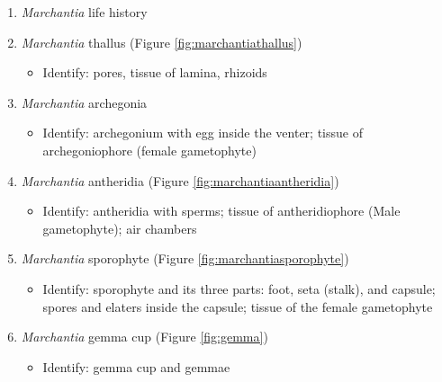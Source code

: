 \documentclass[]{book}
\providecommand{\tightlist}{%
  \setlength{\itemsep}{0pt}\setlength{\parskip}{0pt}}
\begin{document}
\begin{enumerate}
\def\labelenumi{\arabic{enumi}.}
\tightlist
\item
  \emph{Marchantia} life history
\item
  \emph{Marchantia} thallus (Figure \ref{fig:marchantiathallus})

  \begin{itemize}
  \tightlist
  \item
    Identify: pores, tissue of lamina, rhizoids
  \end{itemize}
\item
  \emph{Marchantia} archegonia

  \begin{itemize}
  \tightlist
  \item
    Identify: archegonium with egg inside the venter; tissue of archegoniophore (female gametophyte)
  \end{itemize}
\item
  \emph{Marchantia} antheridia (Figure \ref{fig:marchantiaantheridia})

  \begin{itemize}
  \tightlist
  \item
    Identify: antheridia with sperms; tissue of antheridiophore (Male gametophyte); air chambers
  \end{itemize}
\item
  \emph{Marchantia} sporophyte (Figure \ref{fig:marchantiasporophyte})

  \begin{itemize}
  \tightlist
  \item
    Identify: sporophyte and its three parts: foot, seta (stalk), and capsule; spores and elaters inside the capsule; tissue of the female gametophyte
  \end{itemize}
\item
  \emph{Marchantia} gemma cup (Figure \ref{fig:gemma})

  \begin{itemize}
  \tightlist
  \item
    Identify: gemma cup and gemmae
  \end{itemize}
\end{enumerate}
\end{document}
